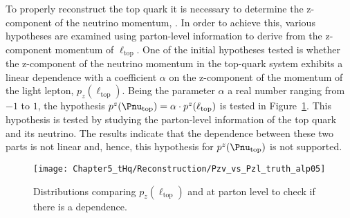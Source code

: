 To properly reconstruct the top quark it is necessary
 to determine the z-component of the neutrino momentum, \pnutopz. 
In order to achieve this, various hypotheses are examined using parton-level information
to derive \pnutopz from the z-component momentum of $\ell_{\text{top}}$.
One of the initial hypotheses tested is whether the z-component of the neutrino momentum in the top-quark system 
exhibits a linear dependence with a coefficient $\alpha$ on the z-component of the momentum of the light lepton, $p_{z}(\ell_{\text{top}})$. 
Being the parameter $\alpha$ a real number ranging from $-1$ to $1$, the hypothesis $p^{z}(\Pnu_{\text{top}}) = \alpha \cdot p^{z}(\ell_{\text{top}})$
is tested in Figure~\ref{fig:tHq:EventReconstruction:TopSystem:hypothesis1}. 
This hypothesis is tested by studying the parton-level information of the top quark and its neutrino. The results indicate that the dependence between these two parts is not linear and, hence, this hypothesis for $p^{z}(\Pnu_{\text{top}})$ is not supported.
\begin{figure}[h] 
	\centering
	\texttt{[image: Chapter5\_tHq/Reconstruction/Pzv\_vs\_Pzl\_truth\_alp05]}
	\caption{Distributions comparing $p_{z}(\ell_{\text{top}})$ and \pnutopz at 
	parton level to check if there is a dependence.}	
	\label{fig:tHq:EventReconstruction:TopSystem:hypothesis1}
\end{figure}

